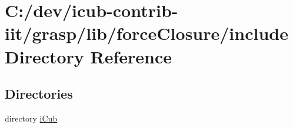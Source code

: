 \section{C\+:/dev/icub-\/contrib-\/iit/grasp/lib/force\+Closure/include Directory Reference}
\label{dir_dd2f03498fece1ec03c5d64bf7e4ae95}
\subsection*{Directories}
\begin{DoxyCompactItemize}
\item 
directory \hyperlink{dir_d8af5f1d61678bce81c720d012e4681b}{i\+Cub}
\end{DoxyCompactItemize}
